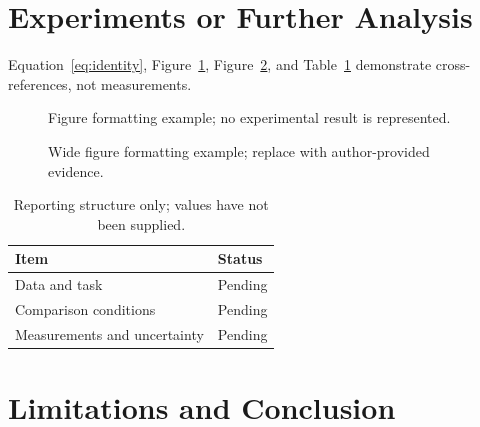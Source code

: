 \section{Experiments or Further Analysis}
\label{sec:results}
Equation~\ref{eq:identity}, Figure~\ref{fig:single}, Figure~\ref{fig:wide}, and
Table~\ref{tab:conditions} demonstrate cross-references, not measurements.
\begin{figure}[htbp]
\centering
{}
\caption{Figure formatting example; no experimental result is represented.}
\label{fig:single}
\end{figure}
\begin{figure}[t]
\centering
{}
\caption{Wide figure formatting example; replace with author-provided evidence.}
\label{fig:wide}
\end{figure}
\begin{table}[htbp]
\centering
\caption{Reporting structure only; values have not been supplied.}
\label{tab:conditions}
\begin{tabular}{ll}
\hline
Item & Status\\
\hline
Data and task & Pending\\
Comparison conditions & Pending\\
Measurements and uncertainty & Pending\\
\hline
\end{tabular}
\end{table}

\FloatBarrier
\section{Limitations and Conclusion}
\label{pw:main-end}
